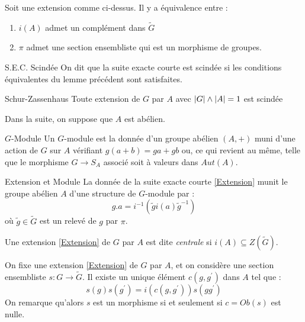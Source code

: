 \documentclass{cours}
\begin{document}
\begin{lemma}
    Soit une extension comme ci-dessus. Il y a équivalence entre :
    \begin{enumerate}
        \item $i(A)$ admet un complément dans $\tilde{G}$
        \item $\pi$ admet une section ensembliste qui est un morphisme de groupes.
    \end{enumerate}
\end{lemma}

\begin{définition}{S.E.C. Scindée}{}
    On dit que la suite exacte courte est scindée si les conditions équivalentes du lemme précédent sont satisfaites.
\end{définition}

\begin{théorème}{Schur-Zassenhaus}{}
    Toute extension de $G$ par $A$ avec $\left|G\right| \wedge \left|A\right| = 1$ est scindée
\end{théorème}

Dans la suite, on suppose que $A$ est abélien.

\begin{définition}{$G$-Module}{}
    Un $G$-module est la donnée d'un groupe abélien $(A, +)$ muni d'une action de $G$ sur $A$ vérifiant $g(a + b) = ga + gb$ ou, ce qui revient au même, telle que le morphisme $G \rightarrow S_{A}$ associé soit à valeurs dans $Aut(A)$.
\end{définition}

\begin{propositionfr}{Extension et Module}{}
    La donnée de la suite exacte courte \ref{Extension} munit le groupe abélien $A$ d'une structure de $G$-module par :
    \[
        g.a = i^{-1}\left(\tilde{g}i(a)\tilde{g}^{-1}\right)
    \]
    où $\tilde{g} \in \tilde{G}$ est un relevé de $g$ par $\pi$.
\end{propositionfr}

\begin{example}
    Une extension \ref{Extension} de $G$ par $A$ est dite \emph{centrale} si $i(A) \subseteq Z(\tilde{G})$.
\end{example}

On fixe une extension \ref{Extension} de $G$ par $A$, et on considère une section ensembliste $s : G \rightarrow \tilde{G}$. Il existe un unique élément $c(g, g^{'})$ dans $A$ tel que :
\[
    s(g)s(g^{'}) = i(c(g, g^{'}))s(gg^{'})
\]
On remarque qu'alors $s$ est un morphisme si et seulement si $c = Ob(s)$ est nulle.
\end{document}
